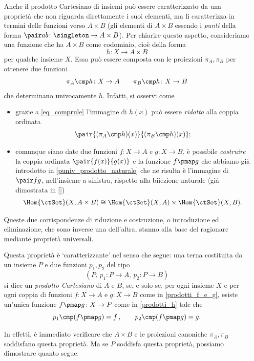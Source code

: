 Anche il prodotto Cartesiano di insiemi può essere caratterizzato da una proprietà che non riguarda direttamente i suoi elementi, ma li caratterizza in termini delle funzioni verso \(A\times B\) (gli elementi di \(A\times B\) essendo i \emph{punti} della forma \(\pair ab \colon \singleton \to A\times B\)). Per chiarire questo aspetto, consideriamo una funzione che ha \(A\times B\) come codominio, cioè della forma
\[\label{prodotti_h}
	h\colon X\to A\times B
\]
per qualche insieme \(X\). Essa può essere composta con le proiezioni \(\pi_A,\pi_B\) per ottenere due funzioni
\[\label{prodotti_f_e_g}
	\pi_A\cmp h\colon X\to A \qquad \pi_B\cmp h\colon X\to B
\]
che determinano univocamente \(h\). Infatti, si osservi come
\begin{itemize}
	\item grazie a \ref{eq_comprule} l'immagine di \(h(x)\) può essere \emph{ridotta} alla coppia ordinata
	      \[\pair{(\pi_A\cmp h)(x)}{(\pi_B\cmp h)(x)};\]
	\item comunque siano date due funzioni \(f \colon X\to A\) e \(g \colon X \to B\), è possibile \emph{costruire} la coppia ordinata \(\pair{f(x)}{g(x)}\) e la funzione \(f\pmap g\) che abbiamo già introdotto in \ref{puniv_prodotto_naturale} che ne risulta è l'immagine di \(\pair fg\), nell'insieme a sinistra, rispetto alla biiezione naturale (già dimostrata in \ref{})
	      \[\Hom{\ctSet}(X,A\times B)\cong\Hom{\ctSet}(X,A)\times\Hom{\ctSet}(X,B).\]
\end{itemize}
Queste due corrispondenze di riduzione e costruzione, o introduzione ed eliminazione, che sono inverse una dell'altra, stanno alla base del ragionare mediante proprietà universali.
\begin{remark}\label{rmk_prodotto}
	Questa proprietà è `caratterizzante' nel senso che segue: una terna costituita da un insieme \(P\) e due funzioni \(p_1,p_2\) del tipo
	\[
		(P,\,  p_1\colon P\to A,\,  p_2\colon P\to B)
	\]
	si dice un \emph{prodotto Cartesiano} di \(A\) e \(B\), se, e solo se, per ogni insieme \(X\) e per ogni coppia di funzioni \(f \colon X \to A\) e \(g \colon X \to B\) come in \eqref{prodotti_f_e_g}, esiste un'unica funzione \(f\pmap g \colon X \to P\) come in \eqref{prodotti_h} tale che
	\[
		p_1\cmp (f\pmap g) = f\,,\qquad p_2\cmp (f\pmap g)=g.
	\]
\end{remark}
In effetti, è immediato verificare che \(A\times B\) e le proiezioni canoniche \(\pi_A,\pi_B\) soddisfano questa proprietà. Ma se \(P\) soddisfa questa proprietà, possiamo dimostrare quanto segue.
